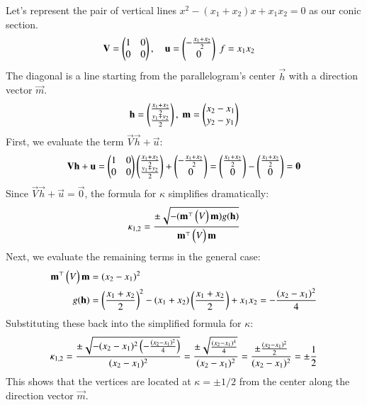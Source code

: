 \documentclass[journal]{IEEEtran}
\theoremstyle{remark}
\begin{document}
\noindent
Let's represent the pair of vertical lines $x^2 - (x_1+x_2)x + x_1x_2 = 0$ as our conic section.
\begin{align}
    \vec{V} &= \myvec{1&0\\0&0}, \quad 
    \vec{u} = \myvec{-\frac{x_1+x_2}{2}\\0}\ 
    f = x_1x_2
\end{align}
The diagonal is a line starting from the parallelogram's center $\vec{h}$ with a direction vector $\vec{m}$.
\begin{align}
    \vec{h} = \myvec{\frac{x_1+x_2}{2} \\ \frac{y_1+y_2}{2} },\ 
    \vec{m} = \myvec{ x_2-x_1 \\ y_2-y_1 }
\end{align}
First, we evaluate the term $\vec{V}\vec{h} + \vec{u}$:
\vspace{0.2cm}
\begin{align}
    \mathbf{V}\mathbf{h} + \mathbf{u} = \begin{pmatrix} 1 & 0 \\ 0 & 0 \end{pmatrix} \begin{pmatrix} \frac{x_1+x_2}{2} \\ \frac{y_1+y_2}{2} \end{pmatrix} + \begin{pmatrix} -\frac{x_1+x_2}{2} \\ 0 \end{pmatrix} = \begin{pmatrix}\frac{x_1+x_2}{2} \\ 0 \end{pmatrix} - \begin{pmatrix}\frac{x_1+x_2}{2} \\ 0 \end{pmatrix} = \mathbf{0}
\end{align}
Since $\vec{V}\vec{h} + \vec{u} = \vec{0}$, the formula for $\kappa$ simplifies dramatically:
\vspace{0.2cm}
\noindent
\begin{align}
    \kappa_{1,2} = \frac{\pm \sqrt{-(\mathbf{m}^{\top} \begin{pmatrix}V\end{pmatrix} \mathbf{m}) g(\mathbf{h})}}{\mathbf{m}^{\top} \begin{pmatrix}V\end{pmatrix} \mathbf{m}}
\end{align}
Next, we evaluate the remaining terms in the general case:
\begin{align}
    \mathbf{m}^{\top} \begin{pmatrix}V\end{pmatrix} \mathbf{m} &= (x_2-x_1)^2 \\
    g(\mathbf{h}) &= \left(\frac{x_1+x_2}{2}\right)^2 - (x_1+x_2)\left(\frac{x_1+x_2}{2}\right) + x_1x_2 = -\frac{(x_2-x_1)^2}{4}
\end{align}
Substituting these back into the simplified formula for $\kappa$:
\vspace{0.2cm}
\noindent
\begin{align}
    \kappa_{1,2} = \frac{\pm \sqrt{-(x_2-x_1)^2 \left(-\frac{(x_2-x_1)^2}{4}\right)}}{(x_2-x_1)^2} = \frac{\pm \sqrt{\frac{(x_2-x_1)^4}{4}}}{(x_2-x_1)^2} = \frac{\pm \frac{(x_2-x_1)^2}{2}}{(x_2-x_1)^2} = \pm \frac{1}{2}
\end{align}
This shows that the vertices are located at $\kappa = \pm 1/2$ from the center along the direction vector $\vec{m}$.
\end{document}
